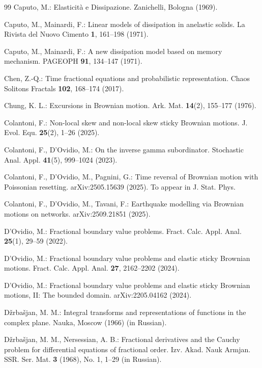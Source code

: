 \documentclass[11pt,a4paper]{article}
\theoremstyle{plain}
\theoremstyle{definition}
\theoremstyle{remark}
\begin{document}
\begin{thebibliography}{99}
			Caputo, M.:
			Elasticit\`a e Dissipazione. Zanichelli, Bologna (1969).
			
			Caputo, M., Mainardi, F.:
			Linear models of dissipation in anelastic solids. La Rivista del Nuovo Cimento \textbf{1}, 161--198 (1971).
			
			Caputo, M., Mainardi, F.:
			A new dissipation model based on memory mechanism. PAGEOPH \textbf{91}, 134--147 (1971).
			
			Chen, Z.-Q.:
			Time fractional equations and probabilistic representation. Chaos Solitons Fractals \textbf{102}, 168--174 (2017).
			
			Chung, K. L.:
			Excursions in Brownian motion. Ark. Mat. \textbf{14}(2), 155--177 (1976).
			
			Colantoni, F.:
			Non-local skew and non-local skew sticky Brownian motions.
			J. Evol. Equ. \textbf{25}(2), 1--26 (2025).
			
			Colantoni, F., D'Ovidio, M.:
			On the inverse gamma subordinator. Stochastic Anal. Appl. \textbf{41}(5), 999--1024 (2023).
			
			Colantoni, F., D'Ovidio, M., Pagnini, G.:
			Time reversal of Brownian motion with Poissonian resetting. arXiv:2505.15639 (2025). To appear in J. Stat. Phys.
			
			Colantoni, F., D'Ovidio, M., Tavani, F.:
			Earthquake modelling via Brownian motions on networks. arXiv:2509.21851 (2025).
			
			D'Ovidio, M.:
			Fractional boundary value problems. Fract. Calc. Appl. Anal. 	\textbf{25}(1), 29--59 (2022).
			
			D'Ovidio, M.:
			Fractional boundary value problems and elastic sticky Brownian motions. Fract. Calc. Appl. Anal. \textbf{27}, 2162--2202 (2024).
			
			D'Ovidio, M.:
			Fractional boundary value problems and elastic sticky Brownian motions, II: The bounded domain. arXiv:2205.04162 (2024).
			
			D\v{z}rba\v{s}jan, M. M.:
			Integral transforms and representations of functions in the complex plane. Nauka, Moscow (1966) (in Russian).
			
			D\v{z}rba\v{s}jan, M. M., Nersessian, A. B.:
			Fractional derivatives and the Cauchy problem for differential equations of fractional order. Izv. Akad. Nauk Armjan. SSR. Ser. Mat. \textbf{3} (1968), No. 1, 1--29 (in Russian).
			

\end{thebibliography}
\end{document}
